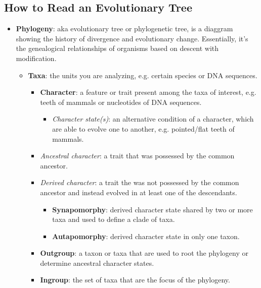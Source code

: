 \documentclass[12pt,a4paper]{article}
\begin{document}
\subsection{How to Read an Evolutionary Tree}
\begin{itemize}
    \item \textbf{Phylogeny}: aka evolutionary tree or phylogenetic tree, is a diaggram showing the history of divergence and evolutionary change. Essentially, it's the {\color{o-Sun}genealogical relationships} of organisms based on descent with modification.
        \begin{itemize}
            \item \textbf{Taxa}: the units you are analyzing, e.g. certain species or DNA sequences.
                \begin{itemize}
                    \item \textbf{Character}: a feature or trait present among the taxa of interest, e.g. teeth of mammals or nucleotides of DNA sequences.
                        \begin{itemize}
                            \item \textit{Character {\color{o-Sun}state(s)}}: an {\color{o-Sun}alternative condition} of a character, which are able to evolve one to another, e.g. pointed/flat teeth of mammals.
                        \end{itemize}
                    \item \textit{{\color{true}Ancestral} character}: a trait that was {\color{true}possessed by the common ancestor}.
                    \item \textit{{\color{false}Derived} character}: a trait the was {\color{false}not possessed by the common ancestor} and instead {\color{o-Sun}evolved} in at least one of the descendants.
                        \begin{itemize}
                            \item \textbf{Synapomorphy}: derived character state shared by {\color{o-Sun} two or more} taxa and used to define a clade of taxa.
                            \item \textbf{Autapomorphy}: derived character state in only {\color{o-Sun}one} taxon.
                        \end{itemize}
                    \item \textbf{Outgroup}: a taxon or taxa that are used to root the phylogeny or determine ancestral character states.
                    \item \textbf{Ingroup}: the set of taxa that are the focus of the phylogeny.

\end{itemize}
\end{itemize}
\end{itemize}
\end{document}
